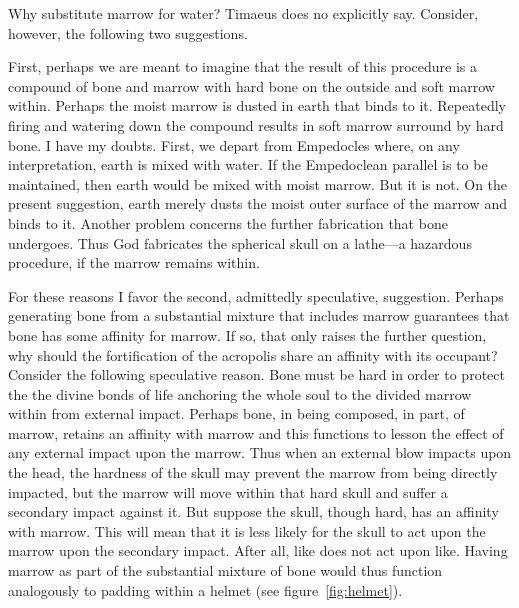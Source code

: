 Why substitute marrow for water? Timaeus does no explicitly say. Consider, however, the following two suggestions.

First, perhaps we are meant to imagine that the result of this procedure is a compound of bone and marrow with hard bone on the outside and soft marrow within. Perhaps the moist marrow is dusted in earth that binds to it. Repeatedly firing and watering down the compound results in soft marrow surround by hard bone. I have my doubts. First, we depart from Empedocles where, on any interpretation, earth is mixed with water. If the Empedoclean parallel is to be maintained, then earth would be mixed with moist marrow. But it is not. On the present suggestion, earth merely dusts the moist outer surface of the marrow and binds to it. Another problem concerns the further fabrication that bone undergoes. Thus God fabricates the spherical skull on a lathe---a hazardous procedure, if the marrow remains within.

For these reasons I favor the second, admittedly speculative, suggestion. Perhaps generating bone from a substantial mixture that includes marrow guarantees that bone has some affinity for marrow. If so, that only raises the further question, why should the fortification of the acropolis share an affinity with its occupant? Consider the following speculative reason. Bone must be hard in order to protect the the divine bonds of life anchoring the whole soul to the divided marrow within from external impact. Perhaps bone, in being composed, in part, of marrow, retains an affinity with marrow and this functions to lesson the effect of any external impact upon the marrow. Thus when an external blow impacts upon the head, the hardness of the skull may prevent the marrow from being directly impacted, but the marrow will move within that hard skull and suffer a secondary impact against it. But suppose the skull, though hard, has an affinity with marrow. This will mean that it is less likely for the skull to act upon the marrow upon the secondary impact. After all, like does not act upon like. Having marrow as part of the substantial mixture of bone would thus function analogously to padding within a helmet (see figure~\ref{fig:helmet}).

